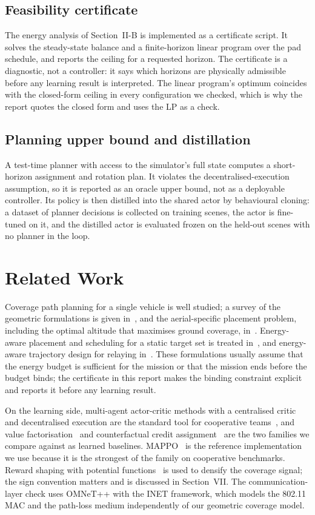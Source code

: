 \documentclass[conference]{IEEEtran}
\begin{document}
\subsection{Feasibility certificate}
\label{sec:cert}
The energy analysis of Section~II-B is implemented as a certificate script. It solves the steady-state balance and a finite-horizon linear program over the pad schedule, and reports the ceiling for a requested horizon. The certificate is a diagnostic, not a controller: it says which horizons are physically admissible before any learning result is interpreted. The linear program's optimum coincides with the closed-form ceiling in every configuration we checked, which is why the report quotes the closed form and uses the LP as a check.

\subsection{Planning upper bound and distillation}
A test-time planner with access to the simulator's full state computes a short-horizon assignment and rotation plan. It violates the decentralised-execution assumption, so it is reported as an oracle upper bound, not as a deployable controller. Its policy is then distilled into the shared actor by behavioural cloning: a dataset of planner decisions is collected on training scenes, the actor is fine-tuned on it, and the distilled actor is evaluated frozen on the held-out scenes with no planner in the loop.

\section{Related Work}
Coverage path planning for a single vehicle is well studied; a survey of the geometric formulations is given in~\cite{galceran2013}, and the aerial-specific placement problem, including the optimal altitude that maximises ground coverage, in~\cite{alhourani2014}. Energy-aware placement and scheduling for a static target set is treated in~\cite{zorbas2016}, and energy-aware trajectory design for relaying in~\cite{zeng2016}. These formulations usually assume that the energy budget is sufficient for the mission or that the mission ends before the budget binds; the certificate in this report makes the binding constraint explicit and reports it before any learning result.

On the learning side, multi-agent actor-critic methods with a centralised critic and decentralised execution are the standard tool for cooperative teams~\cite{lowe2017}, and value factorisation~\cite{rashid2018} and counterfactual credit assignment~\cite{foerster2018} are the two families we compare against as learned baselines. MAPPO~\cite{yu2022} is the reference implementation we use because it is the strongest of the family on cooperative benchmarks. Reward shaping with potential functions~\cite{ng1999} is used to densify the coverage signal; the sign convention matters and is discussed in Section~VII. The communication-layer check uses OMNeT++ with the INET framework, which models the 802.11 MAC and the path-loss medium independently of our geometric coverage model.
\end{document}
